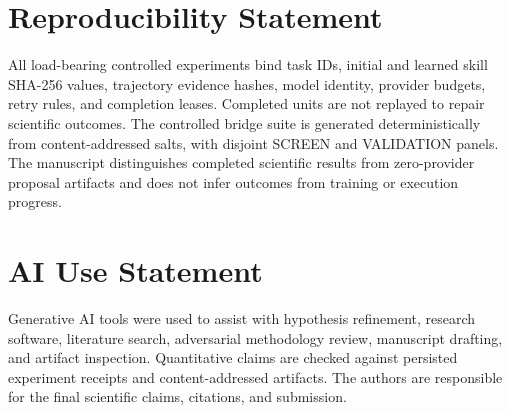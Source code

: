\section*{Reproducibility Statement}
All load-bearing controlled experiments bind task IDs, initial and learned skill SHA-256 values, trajectory evidence hashes, model identity, provider budgets, retry rules, and completion leases. Completed units are not replayed to repair scientific outcomes. The controlled bridge suite is generated deterministically from content-addressed salts, with disjoint SCREEN and VALIDATION panels. The manuscript distinguishes completed scientific results from zero-provider proposal artifacts and does not infer outcomes from training or execution progress.

\section*{AI Use Statement}
Generative AI tools were used to assist with hypothesis refinement, research software, literature search, adversarial methodology review, manuscript drafting, and artifact inspection. Quantitative claims are checked against persisted experiment receipts and content-addressed artifacts. The authors are responsible for the final scientific claims, citations, and submission.
